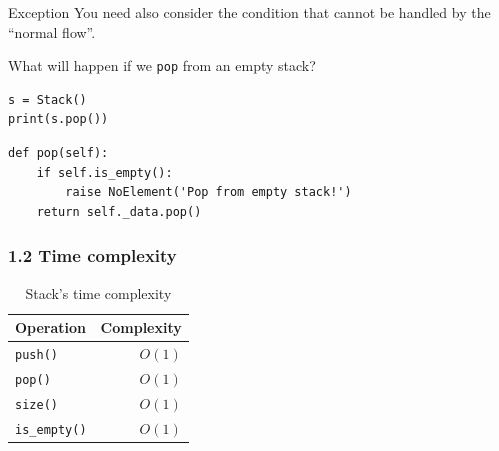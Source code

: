 \documentclass[aspectratio=169, 14pt]{beamer}
\begin{document}
\begin{frame}[fragile]
\begin{block}{Exception}
    You need also consider the condition that cannot be handled by the ``normal flow''.
\end{block}

{\large {}} What will happen if we \texttt{pop} from an empty stack?
\begin{verbatim}
s = Stack()
print(s.pop())   
\end{verbatim}

\pause

\begin{verbatim}
def pop(self):
    if self.is_empty():
        raise NoElement('Pop from empty stack!')
    return self._data.pop()  
\end{verbatim}

\end{frame}

\begin{frame}
    \frametitle{1.2 Time complexity}
    \begin{table}
        \caption{Stack's time complexity}
        \begin{tabular}{lr}
          \toprule
          Operation & Complexity\\
          \midrule
          \texttt{push()} & $O(1)$\\
          \texttt{pop()} & $O(1)$ \\
          \texttt{size()} & $O(1)$ \\
          \texttt{is\_empty()} & $O(1)$ \\ 
          \bottomrule
        \end{tabular}
    \end{table}

\end{frame}
\end{document}
